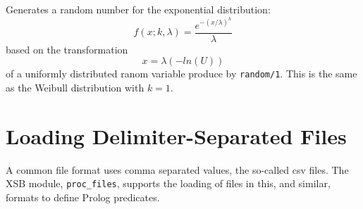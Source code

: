 \begin{description}
%
Generates a random number for the exponential distribution:
\[
  f(x;k,\lambda) = \frac{e^{-(x/\lambda)^h}}{\lambda}
\]
based on the transformation
\[
  x = \lambda(-ln(U))
\]
of a uniformly distributed ranom variable produce by {\tt random/1}.
This is the same as the Weibull distribution with $k = 1$.

\end{description}

\section{Loading Delimiter-Separated Files}

A common file format uses comma separated values, the so-called csv
files.  The XSB module, {\tt proc\_files}, supports the loading of
files in this, and similar, formats to define Prolog predicates.

